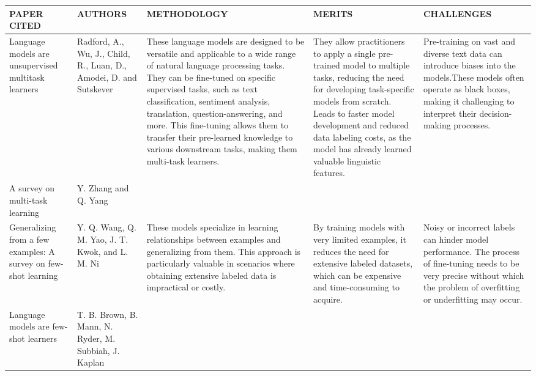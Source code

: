 \documentclass[conference]{IEEEtran}
\begin{document}
\begin{table}
\begin{center}
\begin{tabular}{ |p{2cm}|p{2cm}|p{4cm}|p{3cm}|p{4cm}| }
\hline
\end{tabular}
\end{center}
\end{table}


\begin{table}
\begin{center}
 \centering
    \begin{tabular}{ |p{2cm}|p{2cm}|p{4cm}|p{3cm}|p{4cm}| }
\hline
\centering PAPER CITED & \centering  AUTHORS & \centering METHODOLOGY &  \centering MERITS &  \centering CHALLENGES \arraybackslash \\ 
\hline
[31]  Language models are unsupervised multitask learners & Radford, A., Wu, J., Child, R., Luan, D., Amodei, D. and Sutskever & These language models are designed to be versatile and applicable to a wide range of natural language processing tasks. They can be fine-tuned on specific supervised tasks, such as text classification, sentiment analysis, translation, question-answering, and more. This fine-tuning allows them to transfer their pre-learned knowledge to various downstream tasks, making them multi-task learners. & They allow practitioners to apply a single pre-trained model to multiple tasks, reducing the need for developing task-specific models from scratch. Leads to faster model development and reduced data labeling costs, as the model has already learned valuable linguistic features.  & Pre-training on vast and diverse text data can introduce biases into the models.These models often operate as black boxes, making it challenging to interpret their decision-making processes. \\
\hline
[32] A survey on multi-task learning & Y. Zhang and Q. Yang & & & \\
\hline
[33]  Generalizing from a few examples: A survey on few-shot learning & Y. Q. Wang, Q. M. Yao, J. T. Kwok, and L. M. Ni & These models specialize in learning relationships between examples and generalizing from them. This approach is particularly valuable in scenarios where obtaining extensive labeled data is impractical or costly. & By training models with very limited examples, it reduces the need for extensive labeled datasets, which can be expensive and time-consuming to acquire. & Noisy or incorrect labels can hinder model performance. The process of fine-tuning needs to be very precise without which the problem of overfitting or underfitting may occur. \\
\hline
[35] Language models are few-shot learners & T. B. Brown, B. Mann, N. Ryder, M. Subbiah, J. Kaplan & & & \\

\end{tabular}
\end{center}
\end{table}
\end{document}
